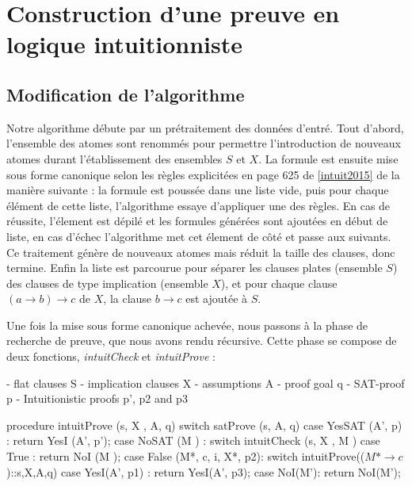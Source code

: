 \section{Construction d'une preuve en logique intuitionniste}

\subsection{Modification de l'algorithme}

Notre algorithme d\'ebute par un pr\'etraitement des donn\'ees d'entr\'e.
Tout d'abord, l'ensemble des atomes sont renomm\'es pour permettre l'introduction de nouveaux atomes durant l'\'etablissement des ensembles $S$ et $X$. La formule est ensuite mise sous forme canonique selon les r\`egles explicit\'ees en page 625 de \ref{intuit2015} de la mani\`ere suivante : la formule est pouss\'ee dans une liste vide, puis pour chaque élément de cette liste, l'algorithme essaye d'appliquer une des r\`egles. En cas de réussite, l'\'element est d\'epil\'e et les formules g\'en\'er\'ees sont ajout\'ees en d\'ebut de liste, en cas d'\'echec l'algorithme met cet \'element de c\^ot\'e et passe aux suivants. Ce traitement g\'en\`ere de nouveaux atomes mais r\'eduit la taille des clauses, donc termine. Enfin la liste est parcourue pour s\'eparer les clauses plates (ensemble $S$) des clauses de type implication (ensemble $X$), et pour chaque clause $(a \rightarrow b) \rightarrow c$ de $X$, la clause $b \rightarrow c$ est ajout\'ee \`a $S$.

Une fois la mise sous forme canonique achev\'ee, nous passons à la phase de recherche de preuve, que nous avons rendu récursive. Cette phase se compose de deux fonctions, \textit{intuitCheck} et \textit{intuitProve} :


- flat clauses S
- implication clauses X
- assumptions A
- proof goal q
- SAT-proof p
- Intuitionistic proofs p', p2 and p3

\begin{listing}[1]{1}
procedure intuitProve (s, X , A, q)
switch satProve (s, A, q)
    case YesSAT (A', p) :
        return YesI (A', p');
    case NoSAT (M ) :
        switch intuitCheck (s, X , M )
            case True :
                return NoI (M );
            case False (M*, c, i, X*, p2):
                switch intuitProve(($M* \rightarrow c$)::s,X,A,q)
                    case YesI(A', p1) :
                        return YesI(A', p3);
                    case NoI(M'):
                        return NoI(M');
\end{listing}

